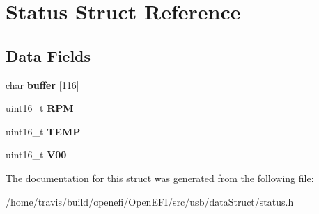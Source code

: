 \hypertarget{structStatus}{}\section{Status Struct Reference}
\label{structStatus}
\subsection*{Data Fields}
\begin{DoxyCompactItemize}
\item 
\mbox{\label{structStatus_a9c6ca06770937b21734b06b6dc031e94}} 
char {\bfseries buffer} \mbox{[}116\mbox{]}
\item 
\mbox{\label{structStatus_aab3c9e3c338c18ff7ee00f6713024cd4}} 
uint16\+\_\+t {\bfseries R\+PM}
\item 
\mbox{\label{structStatus_ad30ed644cfa54545bc648c9e4493422f}} 
uint16\+\_\+t {\bfseries T\+E\+MP}
\item 
\mbox{\label{structStatus_a1dbec211c7079f8d0f546a3a6a3ae0c9}} 
uint16\+\_\+t {\bfseries V00}
\end{DoxyCompactItemize}


The documentation for this struct was generated from the following file\+:\begin{DoxyCompactItemize}
\item 
/home/travis/build/openefi/\+Open\+E\+F\+I/src/usb/data\+Struct/status.\+h\end{DoxyCompactItemize}
